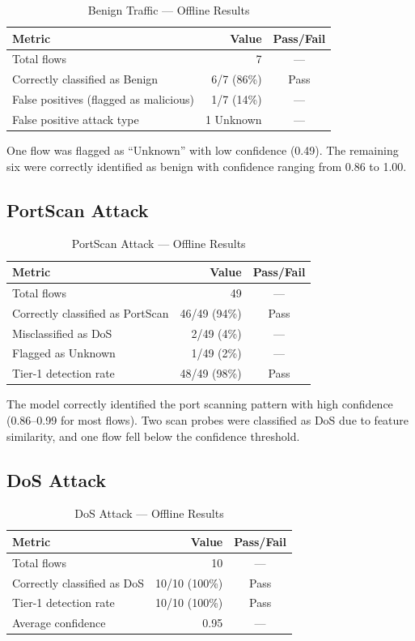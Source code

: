 \documentclass[12pt,a4paper,twoside]{report}
\begin{document}
\begin{table}[H]
\centering
\caption{Benign Traffic — Offline Results}
\begin{tabularx}{\textwidth}{lrc}
\toprule
\textbf{Metric} & \textbf{Value} & \textbf{Pass/Fail} \\
\midrule
Total flows & 7 & — \\
Correctly classified as Benign & 6/7 (86\%) & Pass \\
False positives (flagged as malicious) & 1/7 (14\%) & — \\
False positive attack type & 1 Unknown & — \\
\bottomrule
\end{tabularx}
\end{table}

One flow was flagged as ``Unknown'' with low confidence (0.49). The remaining six were correctly identified as benign with confidence ranging from 0.86 to 1.00.

\subsection{PortScan Attack}

\begin{table}[H]
\centering
\caption{PortScan Attack — Offline Results}
\begin{tabularx}{\textwidth}{lrc}
\toprule
\textbf{Metric} & \textbf{Value} & \textbf{Pass/Fail} \\
\midrule
Total flows & 49 & — \\
Correctly classified as PortScan & 46/49 (94\%) & Pass \\
Misclassified as DoS & 2/49 (4\%) & — \\
Flagged as Unknown & 1/49 (2\%) & — \\
Tier-1 detection rate & 48/49 (98\%) & Pass \\
\bottomrule
\end{tabularx}
\end{table}

The model correctly identified the port scanning pattern with high confidence (0.86--0.99 for most flows). Two scan probes were classified as DoS due to feature similarity, and one flow fell below the confidence threshold.

\subsection{DoS Attack}

\begin{table}[H]
\centering
\caption{DoS Attack — Offline Results}
\begin{tabularx}{\textwidth}{lrc}
\toprule
\textbf{Metric} & \textbf{Value} & \textbf{Pass/Fail} \\
\midrule
Total flows & 10 & — \\
Correctly classified as DoS & 10/10 (100\%) & Pass \\
Tier-1 detection rate & 10/10 (100\%) & Pass \\
Average confidence & 0.95 & — \\
\bottomrule
\end{tabularx}
\end{table}
\end{document}
